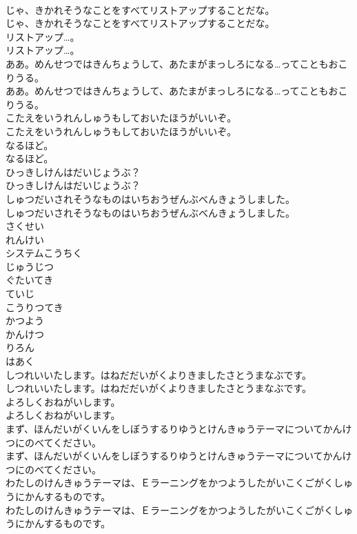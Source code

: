 \documentclass[8pt]{extreport}
\begin{document}
\begin{CJK}{UTF8}{min}
\\	じゃ、きかれそうなことをすべてリストアップすることだな。	
\\	じゃ、きかれそうなことをすべてリストアップすることだな。 
\\	リストアップ…。	
\\	リストアップ…。 
\\	ああ。めんせつではきんちょうして、あたまがまっしろになる…ってこともおこりうる。	
\\	ああ。めんせつではきんちょうして、あたまがまっしろになる…ってこともおこりうる。 
\\	こたえをいうれんしゅうもしておいたほうがいいぞ。	
\\	こたえをいうれんしゅうもしておいたほうがいいぞ。 
\\	なるほど。	
\\	なるほど。 
\\	ひっきしけんはだいじょうぶ？	
\\	ひっきしけんはだいじょうぶ？ 
\\	しゅつだいされそうなものはいちおうぜんぶべんきょうしました。	
\\	しゅつだいされそうなものはいちおうぜんぶべんきょうしました。 
\\	さくせい
\\	れんけい
\\	システムこうちく
\\	じゅうじつ
\\	ぐたいてき
\\	ていじ
\\	こうりつてき
\\	かつよう
\\	かんけつ
\\	りろん
\\	はあく
\\	しつれいいたします。はねだだいがくよりきましたさとうまなぶです。	
\\	しつれいいたします。はねだだいがくよりきましたさとうまなぶです。 
\\	よろしくおねがいします。	
\\	よろしくおねがいします。 
\\	まず、ほんだいがくいんをしぼうするりゆうとけんきゅうテーマについてかんけつにのべてください。	
\\	まず、ほんだいがくいんをしぼうするりゆうとけんきゅうテーマについてかんけつにのべてください。 
\\	わたしのけんきゅうテーマは、Ｅラーニングをかつようしたがいこくごがくしゅうにかんするものです。	
\\	わたしのけんきゅうテーマは、Ｅラーニングをかつようしたがいこくごがくしゅうにかんするものです。 

\end{CJK}
\end{document}
